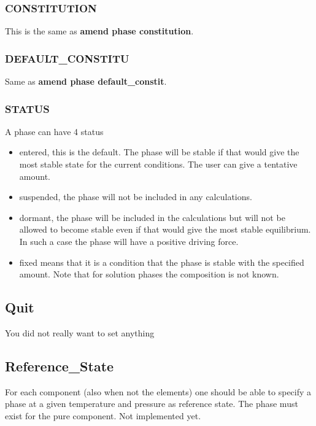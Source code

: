 \documentclass[12pt]{article}
\begin{document}
\subsubsection{CONSTITUTION}

This is the same as {\bf amend phase constitution}.

\subsubsection{DEFAULT\_CONSTITU}

Same as {\bf amend phase default\_constit}.

\subsubsection{STATUS}

A phase can have 4 status

\begin{itemize}
\item entered, this is the default.  The phase will be stable if that
would give the most stable state for the current conditions.  The user
can give a tentative amount.
\item suspended, the phase will not be included in any calculations.
\item dormant, the phase will be included in the calculations but will
not be allowed to become stable even if that would give the most
stable equilibrium.  In such a case the phase will have a positive
driving force.
\item fixed means that it is a condition that the phase is stable with
the specified amount.  Note that for solution phases the composition
is not known.
\end{itemize}

\subsection{Quit}

You did not really want to set anything

\subsection{Reference\_State}

For each component (also when not the elements) one should be able to
specify a phase at a given temperature and pressure as reference
state.  The phase must exist for the pure component.  Not implemented
yet.
\end{document}
